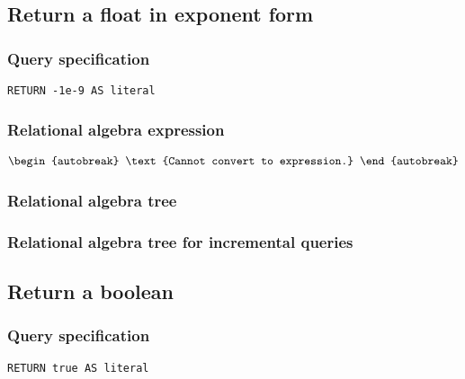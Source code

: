 
\subsection{Return a float in exponent form}

\subsubsection*{Query specification}

\begin{lstlisting}
RETURN -1e-9 AS literal
\end{lstlisting}

\subsubsection*{Relational algebra expression}

\begin{align*}
\begin{autobreak}
\text{Cannot convert to expression.}
\end{autobreak}
\end{align*}

\subsubsection*{Relational algebra tree}


\subsubsection*{Relational algebra tree for incremental queries}


\subsection{Return a boolean}

\subsubsection*{Query specification}

\begin{lstlisting}
RETURN true AS literal
\end{lstlisting}

